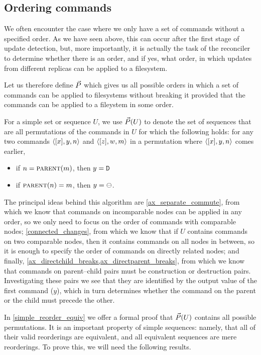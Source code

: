 
\subsection{Ordering commands}\label{ordering}

We often encounter the case where we only have a set of commands without a specified order.
As we have seen above, this can occur after the first stage of update detection,
but, more importantly,
it is actually the task of the reconciler to determine whether there is an order,
and if yes, what order,
in which updates from different replicas can be applied to a filesystem.

Let us therefore define $\ordersetsign$ which gives us all
possible orders in which a set of commands can be applied
to filesystems without breaking it
provided that the commands can be applied to a fileystem in some order.

\begin{mydef}[$\ordersetsign$]\label{def_orderset}
For a simple set or sequence $U$,
we use $\vec{P}({U})$ to denote the set of sequences
that are all permutations of the commands in $U$
for which the following holds:
for any two commands $\langle{[x],y,n}\rangle$ and $\langle{[z],w,m}\rangle$ in a permutation
where $\langle{[x],y,n}\rangle$ comes earlier,
\begin{itemize}
\item if $n=\text{\normalfont\scshape{parent}}(m)$, then $y=\mathtt{D}$
\item if $\text{\normalfont\scshape{parent}}(n)=m$, then $y=\ominus$.
\end{itemize}
\end{mydef}

The principal ideas behind this algorithm are 
\cref{ax_separate_commute}, from which we know that commands on incomparable
nodes can be applied in any order, so we only need to focus on the order of commands
with comparable nodes;
\cref{connected_changes}, from which we know that if $U$ contains commands on two comparable
nodes, then it contains commands on all nodes in between, so it is enough to specify
the order of commands on directly related nodes;
and finally, \cref{ax_directchild_breaks,ax_directparent_breaks}, from which we know
that commands on parent--child pairs must be construction or destruction pairs.
Investigating these pairs we see that they are identified by the output value of the first command ($y$),
which in turn determines whether the command on the parent or the child must precede the other.

In \cref{simple_reorder_equiv} we offer a formal proof that 
$\vec{P}({U})$ contains all possible permutations.
It is an important property of simple sequences: namely, that
all of their valid reorderings are equivalent,
and all equivalent sequences are mere reorderings.
To prove this, we will need the following results.

